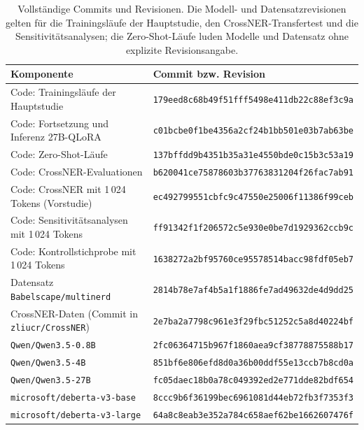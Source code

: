 \begin{table}[ht]
  \centering
  \footnotesize
  \caption[Vollständige Commits und Revisionen]{Vollständige Commits und Revisionen.
  Die Modell- und Datensatzrevisionen gelten für die Trainingsläufe der
  Hauptstudie, den CrossNER-Transfertest und die Sensitivitätsanalysen; die
  Zero-Shot-Läufe luden Modelle und Datensatz ohne explizite
  Revisionsangabe.}
  \label{tab:app-revisionen}
  \begin{tabular}{ll}
    \toprule
    \textbf{Komponente} & \textbf{Commit bzw. Revision} \\
    \midrule
    Code: Trainingsläufe der Hauptstudie     & \texttt{179eed8c68b49f51fff5498e411db22c88ef3c9a} \\
    Code: Fortsetzung und Inferenz 27B-QLoRA & \texttt{c01bcbe0f1be4356a2cf24b1bb501e03b7ab63be} \\
    Code: Zero-Shot-Läufe                    & \texttt{137bffdd9b4351b35a31e4550bde0c15b3c53a19} \\
    Code: CrossNER-Evaluationen              & \texttt{b620041ce75878603b37763831204f26fac7ab91} \\
    Code: CrossNER mit 1\,024 Tokens (Vorstudie) & \texttt{ec492799551cbfc9c47550e25006f11386f99ceb} \\
    Code: Sensitivitätsanalysen mit 1\,024 Tokens & \texttt{ff91342f1f206572c5e930e0be7d1929362ccb9c} \\
    Code: Kontrollstichprobe mit 1\,024 Tokens & \texttt{1638272a2bf95760ce95578514bacc98fdf05eb7} \\
    Datensatz \texttt{Babelscape/multinerd}  & \texttt{2814b78e7af4b5a1f1886fe7ad49632de4d9dd25} \\
    CrossNER-Daten (Commit in \texttt{zliucr/CrossNER}) & \texttt{2e7ba2a7798c961e3f29fbc51252c5a8d40224bf} \\
    \texttt{Qwen/Qwen3.5-0.8B}               & \texttt{2fc06364715b967f1860aea9cf38778875588b17} \\
    \texttt{Qwen/Qwen3.5-4B}                 & \texttt{851bf6e806efd8d0a36b00ddf55e13ccb7b8cd0a} \\
    \texttt{Qwen/Qwen3.5-27B}                & \texttt{fc05daec18b0a78c049392ed2e771dde82bdf654} \\
    \texttt{microsoft/deberta-v3-base}       & \texttt{8ccc9b6f36199bec6961081d44eb72fb3f7353f3} \\
    \texttt{microsoft/deberta-v3-large}      & \texttt{64a8c8eab3e352a784c658aef62be1662607476f} \\
    \bottomrule
  \end{tabular}
\end{table}

